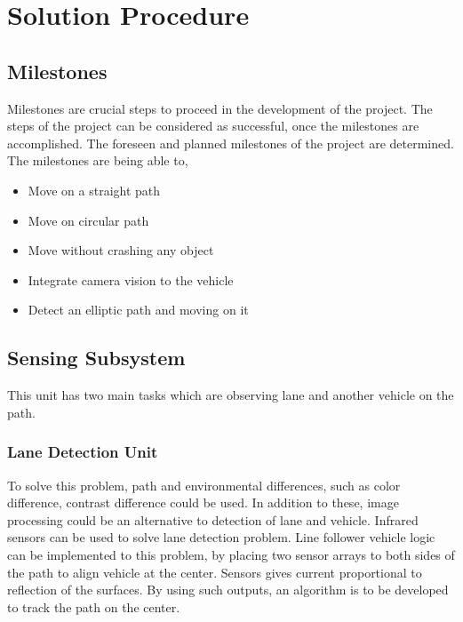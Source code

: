 \documentclass[a4paper,12pt]{article}
\begin{document}
\section{Solution Procedure}

\subsection{Milestones}
	Milestones are crucial steps to proceed in the development of the project. The steps of the project can be considered as successful, once the milestones are accomplished. The foreseen and planned milestones of the project are determined. The milestones are being able to,
	\begin{itemize}
		\item Move on a straight path  \vspace{-.2cm}
		\item Move on circular path \vspace{-.2cm}
		\item Move without crashing any object \vspace{-.2cm}
		\item Integrate camera vision to the vehicle  \vspace{-.2cm}
		\item Detect an elliptic path and moving on it \vspace{-.2cm}	
	\end{itemize}

	 
	

\subsection{Sensing Subsystem}
This unit has two main tasks which are observing lane and another vehicle on the path. 
\subsubsection{Lane Detection Unit}
To solve this problem, path and environmental differences, such as color difference, contrast difference could be used. In addition to these, image processing could be an alternative to detection of lane and vehicle. 
Infrared sensors can be used to solve lane detection problem. Line follower vehicle logic can be implemented to this problem, by placing two sensor arrays to both sides of the path to align vehicle at the center. Sensors gives current proportional to reflection of the surfaces. By using such outputs, an algorithm is to be developed to track the path on the center. 
\end{document}
